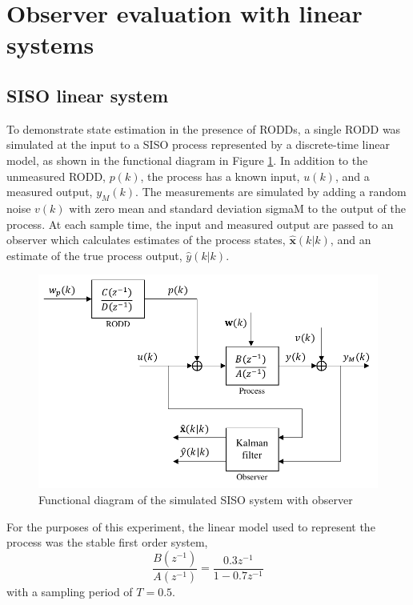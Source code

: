 \section{Observer evaluation with linear systems} \label{section:sim-obs-lin}

\subsection{SISO linear system} \label{sim-obs-lin-1}

To demonstrate state estimation in the presence of \gls{RODD}s, a single \gls{RODD} was simulated at the input to a SISO process represented by a discrete-time linear model, as shown in the functional diagram in Figure \ref{fig:sim-sys-diag-siso}. In addition to the unmeasured \gls{RODD}, $p(k)$, the process has a known input, $u(k)$, and a measured output, $y_M(k)$. The measurements are simulated by adding a random noise $v(k)$ with zero mean and standard deviation \gls{sigmaM} to the output of the process. At each sample time, the input and measured output are passed to an observer which calculates estimates of the process states, $\hat{\mathbf{x}}(k|k)$, and an estimate of the true process output, $\hat{y}(k|k)$.
\begin{figure}[htp]
	\centering
	\includegraphics[width=11.5cm]{images/sim-sys-diag-siso.pdf}
	\caption{Functional diagram of the simulated SISO system with observer}
	\label{fig:sim-sys-diag-siso}
\end{figure}

For the purposes of this experiment, the linear model used to represent the process was the stable first order system,
\begin{equation}
	\frac{B(z^{-1})}{A(z^{-1})} = \frac{0.3z^{-1}}{1-0.7z^{-1}}
\end{equation}
with a sampling period of $T=0.5$.

